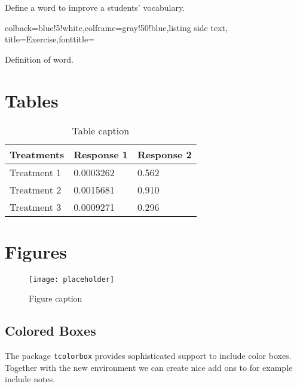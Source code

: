 Define a word to improve a students' vocabulary.

\begin{tcblisting}{colback=blue!5!white,colframe=gray!50!blue,listing side text,  title=Exercise,fonttitle=\bfseries}
\begin{vocabulary}[Word]
Definition of word.
\end{vocabulary}
\end{tcblisting}

\section{Tables}

\begin{table}[h]
\centering
\begin{tabular}{l l l}
\toprule
\textbf{Treatments} & \textbf{Response 1} & \textbf{Response 2}\\
\midrule
Treatment 1 & 0.0003262 & 0.562 \\
Treatment 2 & 0.0015681 & 0.910 \\
Treatment 3 & 0.0009271 & 0.296 \\
\bottomrule
\end{tabular}
\caption{Table caption}
\end{table}


\section{Figures}

\begin{figure}[h]
\centering\texttt{[image: placeholder]}
\caption{Figure caption}
\end{figure}

\subsection{Colored Boxes}

The package \verb|tcolorbox| provides sophisticated support to include
color boxes. Together with the new environment we can create nice add
ons to for example include notes.


